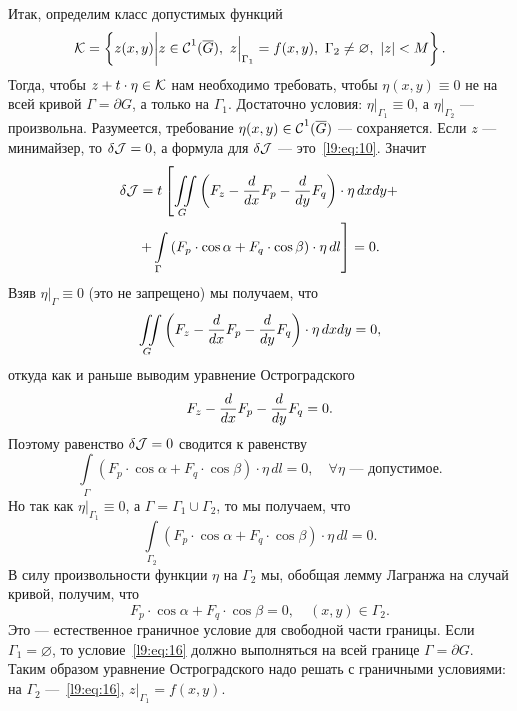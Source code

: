 Итак, определим класс допустимых функций
\begin{equation*}
	\K=\left\{z(x,y)\middle|z\in\Cfn{1}(\overline{G}),\ z\Big|_{\Gamma_1}=f(x,y),\ \Gamma_2\neq\varnothing,\ |z|<M\right\}.
\end{equation*}  
Тогда, чтобы $z+t\cdot\eta\in\mathcal{K}$ нам необходимо требовать, чтобы $\eta(x,y)\equiv0$ не на всей кривой $\Gamma=\partial G$, а только на $\Gamma_1$. Достаточно условия: $\eta\Big|_{\Gamma_1}\equiv0$, а $\eta\Big|_{\Gamma_2}$ --- произвольна. Разумеется, требование $\eta(x,y)\in\mathcal{C}{\mathstrut}^{1}_{}(\overline{G})$ --- сохраняется. Если $z$ --- минимайзер, то $\delta\mathcal{J}=0$, а формула для $\delta\mathcal{J}$ --- это~\eqref{l9:eq:10}. Значит
\begin{multline*}
	\delta\mathcal{J}=t\left[\iint\limits_{G}\left(F_z-\frac{d}{dx}F_p-\frac{d}{dy}F_q\right)\cdot\eta\,dxdy+\right.\\\left.+\int\limits_{\Gamma}\left(F_p\cdot\cos\alpha+F_q\cdot\cos\beta\right)\cdot\eta\,dl\right]=0.
\end{multline*}
Взяв $\eta\Big|_{\Gamma}\equiv0$ (это не запрещено) мы получаем, что
\begin{equation*}
	\iint\limits_{G}\left(F_z-\frac{d}{dx}F_p-\frac{d}{dy}F_q\right)\cdot\eta\,dxdy=0,
\end{equation*}
откуда как и раньше выводим уравнение Остроградского
\begin{equation*}
	 F_z-\frac{d}{dx}F_p-\frac{d}{dy}F_q=0.
\end{equation*}
Поэтому равенство $\delta\mathcal{J}=0$ сводится к равенству
\begin{equation*}
	\int\limits_{\Gamma}(F_p\cdot\cos\alpha+F_q\cdot\cos\beta)\cdot\eta\,dl=0,\quad\forall\eta\text{ --- допустимое.}
\end{equation*}
Но так как $\eta\Big|_{\Gamma_1}\equiv0$, а $\Gamma=\Gamma_1\cup\Gamma_2$, то мы получаем, что
\begin{equation}\label{l9:eq:15}
	\int\limits_{\Gamma_2}(F_p\cdot\cos\alpha+F_q\cdot\cos\beta)\cdot\eta\,dl=0.
\end{equation}
В силу произвольности функции $\eta$ на $\Gamma_2$ мы, обобщая лемму Лагранжа на случай кривой, получим, что
\begin{equation}\label{l9:eq:16}
	 F_p\cdot\cos\alpha+F_q\cdot\cos\beta=0,\quad(x,y)\in\Gamma_2.
\end{equation}
Это --- естественное граничное условие для свободной части границы. Если $\Gamma_1=\varnothing$, то условие~\eqref{l9:eq:16} должно выполняться на всей границе $\Gamma=\partial G$. Таким образом уравнение Остроградского надо решать с граничными условиями: на $\Gamma_2$ ---~\eqref{l9:eq:16}, $z\Big|_{\Gamma_1}=f(x,y)$.

